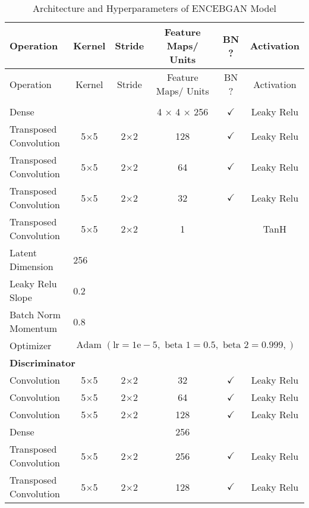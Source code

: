 \begin{longtable}[c]{@{}lccccc@{}}
	\caption{Architecture and Hyperparameters of ENCEBGAN Model}
	\label{tab:encebgan_imp}\\
	\toprule
	Operation & Kernel & Stride & Feature Maps/ Units & BN ? & Activation \\* \midrule
	\endfirsthead
	\toprule
	Operation & Kernel & Stride & Feature Maps/ Units & BN ? & Activation \\* \midrule
	\endhead
	\bottomrule
	\endfoot
	\endlastfoot
	\multicolumn{6}{l}{\textbf{Generator}} \\
	Dense & \multicolumn{1}{c}{} &  & 4 $\times$ 4 $\times$ 256 & $\checkmark$ & Leaky Relu \\
	Transposed Convolution & \multicolumn{1}{c}{5$\times$5} & 2$\times$2 & 128 & $\checkmark$ & Leaky Relu \\
	Transposed Convolution & \multicolumn{1}{c}{5$\times$5} & 2$\times$2 & 64 & $\checkmark$ & Leaky Relu \\
	Transposed Convolution & \multicolumn{1}{c}{5$\times$5} & 2$\times$2 & 32 & $\checkmark$ & Leaky Relu \\
	Transposed Convolution & \multicolumn{1}{c}{5$\times$5} & 2$\times$2 & 1 &  & TanH\\
	Latent Dimension & \multicolumn{5}{l}{256} \\
	Leaky Relu Slope & \multicolumn{5}{l}{0.2} \\
	Batch Norm Momentum & \multicolumn{5}{l}{0.8} \\
	Optimizer & \multicolumn{5}{l}{$\text { Adam }(\mathrm{lr}=1 \mathrm{e}-5, \text { beta } 1=0.5, \text { beta } 2=0.999,)$} \\ \hline
	\multicolumn{6}{l}{\textbf{Discriminator}} \\
	Convolution & \multicolumn{1}{c}{5$\times$5} & 2$\times$2 & 32 & $\checkmark$ & Leaky Relu \\
	Convolution & \multicolumn{1}{c}{5$\times$5} & 2$\times$2 & 64 & $\checkmark$ & Leaky Relu \\
	Convolution & \multicolumn{1}{c}{5$\times$5} & 2$\times$2 & 128 & $\checkmark$ & Leaky Relu \\
	Dense & \multicolumn{1}{c}{} &  & 256 &  &  \\ \hline
	Transposed Convolution & \multicolumn{1}{c}{5$\times$5} & 2$\times$2 & 256 & $\checkmark$ & Leaky Relu \\
	Transposed Convolution & \multicolumn{1}{c}{5$\times$5} & 2$\times$2 & 128 & $\checkmark$ & Leaky Relu \\

\end{longtable}
